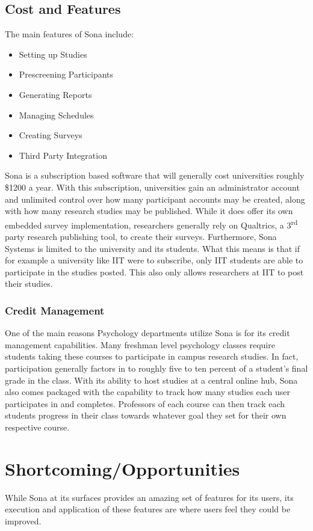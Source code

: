 \documentclass[12pt]{article}
\begin{document}
\subsection{Cost and Features}\label{features}
The main features of Sona include:
\begin{itemize}
	\item Setting up Studies
	\item Prescreening Participants
	\item Generating Reports
	\item Managing Schedules
	\item Creating Surveys
	\item Third Party Integration
\end{itemize}
 Sona is a subscription based software that will generally cost universities roughly \$1200 a year. With this subscription, universities gain an administrator account and unlimited control over how many participant accounts may be created, along with how many research studies may be published. While it does offer its own embedded survey implementation, researchers generally rely on Qualtrics, a 3\textsuperscript{rd} party research publishing tool, to create their surveys. Furthermore, Sona Systems is limited to the university and its students. What this means is that if for example a university like IIT were to subscribe, only IIT students are able to participate in the studies posted. This also only allows researchers at IIT to post their studies.
\subsubsection{Credit Management}
One of the main reasons Psychology departments utilize Sona is for its credit management capabilities. Many freshman level psychology classes require students taking these courses to participate in campus research studies. In fact, participation generally factors in to roughly five to ten percent of a student's final grade in the class. With its ability to host studies at a central online hub, Sona also comes packaged with the capability to track how many studies each user participates in and completes. Professors of each course can then track each students progress in their class towards whatever goal they set for their own respective course. 
\section{Shortcoming/Opportunities}\label{improve}
While Sona at its surfaces provides an amazing set of features for its users, its execution and application of these features are where users feel they could be improved. 
\end{document}
